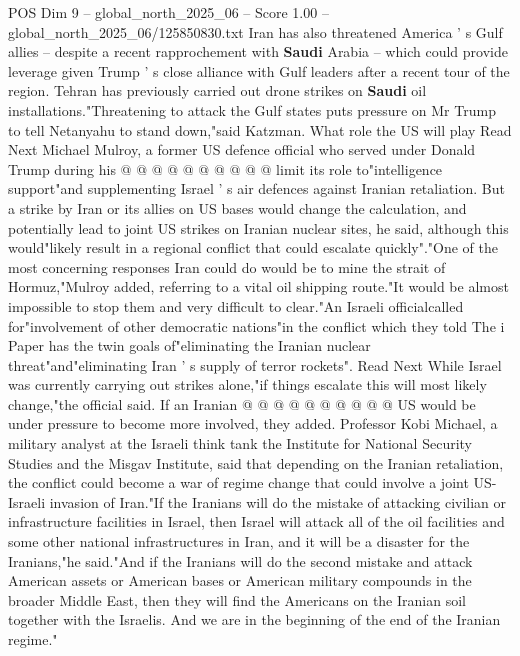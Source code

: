 \begin{textsample}{POS Dim 9 – global\_north\_2025\_06 – Score 1.00 – global\_north\_2025\_06/125850830.txt}
Iran has also threatened America ' s Gulf allies -- despite a recent rapprochement with \textbf{Saudi} Arabia -- which could provide leverage given Trump ' s close alliance with Gulf leaders after a recent tour of the region.
Tehran has previously carried out drone strikes on \textbf{Saudi} oil installations."Threatening to attack the Gulf states puts pressure on Mr Trump to tell Netanyahu to stand down,"said Katzman.
What role the US will play Read Next Michael Mulroy, a former US defence official who served under Donald Trump during his @ @ @ @ @ @ @ @ @ @ limit its role to"intelligence support"and supplementing Israel ' s air defences against Iranian retaliation.
But a strike by Iran or its allies on US bases would change the calculation, and potentially lead to joint US strikes on Iranian nuclear sites, he said, although this would"likely result in a regional conflict that could escalate quickly"."One of the most concerning responses Iran could do would be to mine the strait of Hormuz,"Mulroy added, referring to a vital oil shipping route."It would be almost impossible to stop them and very difficult to clear."An Israeli officialcalled for"involvement of other democratic nations"in the conflict which they told The i Paper has the twin goals of"eliminating the Iranian nuclear threat"and"eliminating Iran ' s supply of terror rockets".
Read Next While Israel was currently carrying out strikes alone,"if things escalate this will most likely change,"the official said.
If an Iranian @ @ @ @ @ @ @ @ @ @ US would be under pressure to become more involved, they added.
Professor Kobi Michael, a military analyst at the Israeli think tank the Institute for National Security Studies and the Misgav Institute, said that depending on the Iranian retaliation, the conflict could become a war of regime change that could involve a joint US-Israeli invasion of Iran."If the Iranians will do the mistake of attacking civilian or infrastructure facilities in Israel, then Israel will attack all of the oil facilities and some other national infrastructures in Iran, and it will be a disaster for the Iranians,"he said."And if the Iranians will do the second mistake and attack American assets or American bases or American military compounds in the broader Middle East, then they will find the Americans on the Iranian soil together with the Israelis.
And we are in the beginning of the end of the Iranian regime."

\end{textsample}

